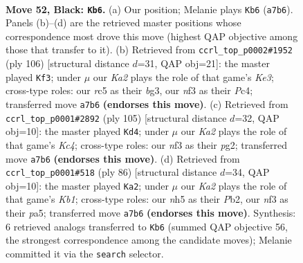 \documentclass[11pt]{article}
\begin{document}
\clearpage

\begin{figure}[p]\centering
\begin{subfigure}{0.46\textwidth}\centering
\resizebox{\linewidth}{!}{%
\newchessgame
\chessboard[
  setfen={3r4/k7/8/2RB1p1N/1P6/3b1N2/6P1/2K5 b - - 1 52},
  showmover=false,
  pgfstyle=straightmove, color=movearrow, markmove={a7-b6}
]}
\caption{}
\end{subfigure}\hfill
\begin{subfigure}{0.46\textwidth}\centering
\resizebox{\linewidth}{!}{%
\newchessgame
\chessboard[
  setfen={8/4k3/7R/2pB2r1/2P4p/4K1b1/8/8 w - - 4 54},
  showmover=false,
  pgfstyle=straightmove, color=movearrow, markmove={e3-f3}
]}
\caption{}
\end{subfigure}
\\[4pt]
\begin{subfigure}{0.46\textwidth}\centering
\resizebox{\linewidth}{!}{%
\newchessgame
\chessboard[
  setfen={8/rB6/8/2k5/7p/6bP/4K1P1/1R6 b - - 1 53},
  showmover=false,
  pgfstyle=straightmove, color=movearrow, markmove={c5-d4}
]}
\caption{}
\end{subfigure}\hfill
\begin{subfigure}{0.46\textwidth}\centering
\resizebox{\linewidth}{!}{%
\newchessgame
\chessboard[
  setfen={8/4k3/6R1/p1r3b1/3p4/P2B4/1P6/1K6 w - - 1 44},
  showmover=false,
  pgfstyle=straightmove, color=movearrow, markmove={b1-a2}
]}
\caption{}
\end{subfigure}
\caption{\textbf{Move 52, Black: \texttt{Kb6}.} (a) Our position; Melanie plays \texttt{Kb6} (\texttt{a7b6}). Panels (b)--(d) are the retrieved master positions whose correspondence most drove this move (highest QAP objective among those that transfer to it). (b) Retrieved from \texttt{ccrl\_top\_p0002\#1952} (ply 106) [structural distance $d$=31, QAP obj=21]: the master played \texttt{Kf3}; under $\mu$ our \emph{Ka2} plays the role of that game's \emph{Ke3}; cross-type roles: our \emph{r}c5 as their \emph{b}g3, our \emph{n}f3 as their \emph{P}c4; transferred move \texttt{a7b6} \textbf{(endorses this move)}. (c) Retrieved from \texttt{ccrl\_top\_p0001\#2892} (ply 105) [structural distance $d$=32, QAP obj=10]: the master played \texttt{Kd4}; under $\mu$ our \emph{Ka2} plays the role of that game's \emph{Kc4}; cross-type roles: our \emph{n}f3 as their \emph{p}g2; transferred move \texttt{a7b6} \textbf{(endorses this move)}. (d) Retrieved from \texttt{ccrl\_top\_p0001\#518} (ply 86) [structural distance $d$=34, QAP obj=10]: the master played \texttt{Ka2}; under $\mu$ our \emph{Ka2} plays the role of that game's \emph{Kb1}; cross-type roles: our \emph{n}h5 as their \emph{P}b2, our \emph{n}f3 as their \emph{p}a5; transferred move \texttt{a7b6} \textbf{(endorses this move)}. Synthesis: 6 retrieved analogs transferred to \texttt{Kb6} (summed QAP objective 56, the strongest correspondence among the candidate moves); Melanie committed it via the \texttt{search} selector.}
\label{fig:thought-m103}
\end{figure}
\end{document}
